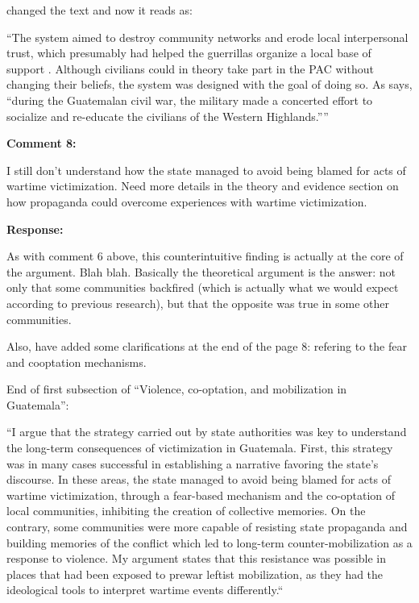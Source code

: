 \documentclass[12pt, a4paper, notitlepage]{article}
\begin{document}
changed the text and now it reads as:

``The system aimed to destroy community networks and erode local interpersonal trust, which presumably had helped the guerrillas organize a local base of support \citep{SaenzdeTejada:2004aa}.
Although civilians could in theory take part in the PAC without changing their beliefs, the system was designed with the goal of doing so.
As \citet[641]{Bateson:2017aa} says, ``during the Guatemalan civil war, the military made a concerted effort to socialize and re-educate the civilians of the Western Highlands.''''


\vspace{15pt}
\noindent\textbf{Comment 8:}
\begin{displayquote}
I still don't understand how the state managed to avoid being blamed for acts of wartime victimization. Need more details in the theory and evidence section on how propaganda could overcome experiences with wartime victimization.
\end{displayquote}

\noindent\textbf{Response:} {}

As with comment 6 above, this counterintuitive finding is actually at the core of the argument. Blah blah. Basically the theoretical argument is the answer: not only that some communities backfired (which is actually what we would expect according to previous research), but that the opposite was true in some other communities.

Also, have added some clarifications at the end of the page 8: refering to the fear and cooptation mechanisms.

End of first subsection of ``Violence, co-optation, and mobilization in Guatemala'':

``I argue that the strategy carried out by state authorities was key to understand the long-term consequences of victimization in Guatemala.
First, this strategy was in many cases successful in establishing a narrative favoring the state's discourse.
In these areas, the state managed to avoid being blamed for acts of wartime victimization, through a fear-based mechanism and the co-optation of local communities, inhibiting the creation of collective memories.
On the contrary, some communities were more capable of resisting state propaganda and building memories of the conflict which led to long-term counter-mobilization as a response to violence.
My argument states that this resistance was possible in places that had been exposed to prewar leftist mobilization, as they had the ideological tools to interpret wartime events differently.``
\end{document}
